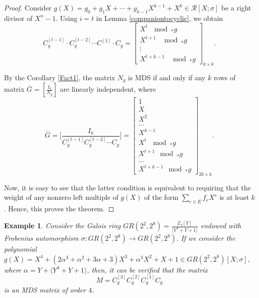 \documentclass[11pt]{article}
\newtheorem{example}{Example}
\begin{document}
\begin{proof}Consider \(g(X)=g_0+g_1X+\cdots+g_{k-1}X^{k-1}+X^k\in \mathcal{R}[X;\sigma]\) be a right divisor of $X^{n}-1$. Using $i=t$ in Lemma \ref{companiontocyclic}, we obtain
	$$C^{[t-1]}_g\cdot C^{[t-2]}_g\cdots C^{[1]}\cdot C_g=\begin{bmatrix}
		X^t~ \mod _*g  \\
		X^{t+1}~\ \mod _*g  \\
		\vdots\\
		X^{t+k-1}~\ \mod _*g  
	\end{bmatrix}_{k \times k}.$$
    
	By the Corollary \ref{Fact1}, the matrix $N_g$ is MDS if and only if any $k$ rows of matrix $\bar{G}=\left[ \frac{I_k}{N_g}\right]$ are linearly independent, where
	$$\bar{G}=\Big[\frac{I_{k}}{C_g^{[t-1]} C_g^{[t-2]} \cdots C_g}\Big]=\begin{bmatrix}
		1\\X\\X^2\\
		\dots\\
		X^{k-1}\\
		X^t~ \mod _*g  \\
		X^{t+1} \mod _*g  \\
		\dots\\
		X^{t+k-1} \mod _*g  
	\end{bmatrix}_{2k\times k}.$$
    
	Now, it is easy to see that the latter condition is equivalent to requiring that the weight of any nonzero left multiple of \( g(X) \) of the form \( \sum_{e \in E} f_e X^e \) is at least \( k \). Hence, this proves the theorem.
 \end{proof}
 
\begin{example}Consider the Galois ring 
\( GR(2^2, 2^8)=\frac{\mathbb{Z}_4[Y]}{\langle Y^4+Y+1 \rangle} \) endowed with Frobenius automorphism 
$ \sigma : GR(2^2, 2^8) \rightarrow GR(2^2, 2^8).$ If we consider the polynomial
\(
g(X) = X^4 + (2\alpha^3 + \alpha^2 + 3\alpha + 3)X^3 + \alpha^3 X^2 +X+ 1
\in GR(2^2, 2^8)[X; \sigma],
\) where $\alpha=Y+\langle Y^4+Y+1 \rangle$, 
then, it can be verified that the matrix
\[
M = C_g^{[3]} C_g^{[2]} C_g^{[1]} C_g
\]
is an MDS matrix of order \( 4 \).
\end{example}
\end{document}
